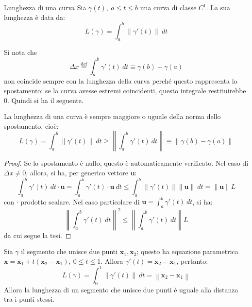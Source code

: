 \documentclass[11pt, a4paper]{scrartcl}
\theoremstyle{definition}
\numberwithin{esempio}{section}
\theoremstyle{definition}
\numberwithin{obs}{section}
\numberwithin{nota}{section}
\numberwithin{equation}{subsection}
\begin{document}
\begin{definizione}
	{Lunghezza di una curva}{}
	Sia $\gamma(t), \ a\le t \le b$ una curva di classe $C^1$. La sua lunghezza \`e data da:
	\[
	L(\gamma) = \int_{a} ^b \left\lVert \gamma'(t) \right\rVert  \ dt
	\] 
\end{definizione}
	Si nota che 
	\[
	\Delta x \overset{\text{def}}{=} \int_{a} ^b \gamma'(t) \ dt \equiv \gamma(b) - \gamma(a)
	\] 
	non coincide sempre con la lunghezza della curva perch\'e questo rappresenta lo spostamento: se la curva avesse estremi coincidenti, questo integrale restituirebbe $0$. Quindi si ha il seguente.
	\begin{teorema}
		{}{}
La lunghezza di una curva \`e sempre maggiore o uguale della norma dello spostamento, cio\`e:
\[
L(\gamma) = \int_{a} ^b \left\lVert \gamma'(t) \right\rVert \ dt \ge \left\lVert \int_{a} ^b \gamma'(t) \ dt \right\rVert  \equiv \left\lVert \gamma(b) - \gamma(a) \right\rVert 
\] 
\begin{proof}
	Se lo spostamento \`e nullo, questo \`e automaticamente verificato. 
	Nel caso di $\Delta x \neq 0  $, allora, si ha, per generico vettore $\mathbf{u} $:
	\[
	\int_{a} ^b \gamma'(t) \ dt \cdot  \mathbf{u} = \int_{a} ^b \gamma'(t)\cdot  \mathbf{u} \ dt \le \int_{a } ^b \left\lVert \gamma'(t) \right\rVert \left\lVert \mathbf{u}  \right\rVert \ dt = \left\lVert \mathbf{u}  \right\rVert  L
	\] 
	con $\cdot $ prodotto scalare.
	Nel caso particolare di $\mathbf{u}  = \int_{a}^b \gamma'(t) \ dt $, si ha:
	\[
	\left\lVert \int_{a} ^b \gamma'(t) \ dt  \right\rVert ^2 \le \left\lVert \int_{a} ^b \gamma'(t) \ dt \right\rVert  L 
	\] 
da cui segue la tesi.	
\end{proof}
	\end{teorema}
Sia $\gamma$ il segmento che unisce due punti $\mathbf{x}_1 , \mathbf{x} _2$; questo ha equazione parametrica $\mathbf{x}  = \mathbf{x} _1 + t (\mathbf{x} _2 - \mathbf{x} _1) , \ 0\le  t \le 1$. Allora $\gamma'(t) = \mathbf{x} _2 - \mathbf{x} _1$, pertanto:
\[
L(\gamma) = \int_{0} ^1 \left\lVert \gamma'(t) \right\rVert \ dt = \left\lVert \mathbf{x}_2 - \mathbf{x} _1  \right\rVert 
\] 
Allora la lunghezza di un segmento che unisce due punti \`e uguale alla distanza tra i punti stessi.
\end{document}
